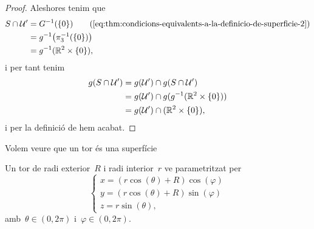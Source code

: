 \documentclass[../../main.tex]{subfiles}
\begin{document}
\begin{proof}
        Aleshores tenim que
        \begin{align*}
            S\cap\obert{U}'&=G^{-1}(\{0\}) \tag{\ref{eq:thm:condicions-equivalents-a-la-definicio-de-superficie-2}}\\
            &=g^{-1}\big(\pi_{3}^{-1}(\{0\})\big) \\
            &=g^{-1}(\mathbb{R}^{2}\times\{0\}),
        \end{align*}
        i per tant tenim
        \begin{align*}
            g(S\cap\mathcal{U}')&=g(\mathcal{U}')\cap g(S\cap\mathcal{U}') \\
            &=g(\mathcal{U}')\cap g(g^{-1}(\mathbb{R}^{2}\times\{0\})) \\
            &=g(\mathcal{U}')\cap(\mathbb{R}^{2}\times\{0\}),
        \end{align*}
        i per la definició de  hem acabat.
    \end{proof}
    \begin{example}
        \label{ex:un-tor-es-una-superficie}
        Volem veure que un tor és una superfície
    \end{example}
    \begin{solution}
        Un tor de radi exterior~\(R\) i radi interior~\(r\) ve parametritzat per
        \[\begin{cases*}
            x=(r\cos(\theta)+R)\cos(\varphi) \\
            y=(r\cos(\theta)+R)\sin(\varphi) \\
            z=r\sin(\theta),
        \end{cases*}\]
        amb~\(\theta\in(0,2\pi)\) i~\(\varphi\in(0,2\pi)\).
    \end{solution}
\end{document}
